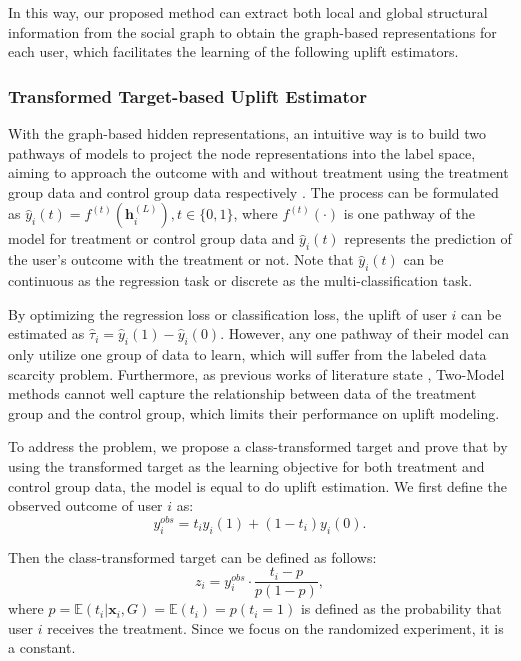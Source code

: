 In this way, our proposed method can extract both local and global structural information from the social graph to obtain the graph-based representations for each user, which facilitates the learning of the following uplift estimators.

\subsubsection{Transformed Target-based Uplift Estimator}
\label{sec:uplift}
With the graph-based hidden representations, an intuitive way is to build two pathways of models to project the node representations into the label space, aiming to approach the outcome with and without treatment using the treatment group data and control group data respectively \cite{guo2020learning,guo2020counterfactual}. The process can be formulated as $\hat{y}_i(t) = f^{(t)}(\mathbf{h}_i^{(L)}), t\in\{0,1\}$, where $f^{(t)}(\cdot)$ is one pathway of the model for treatment or control group data and $\hat{y}_{i}(t)$ represents the prediction of the user's outcome with the treatment or not. Note that $\hat{y}_{i}(t)$ can be continuous as the regression task or discrete as the multi-classification task. 

By optimizing the regression loss or classification loss, the uplift of user $i$ can be estimated as $\hat{\tau}_i = \hat{y}_{i}(1) - \hat{y}_{i}(0)$. However, any one pathway of their model can only utilize one group of data to learn, which will suffer from the labeled data scarcity problem. Furthermore, as previous works of literature state \cite{gutierrez2017causal}, Two-Model methods cannot well capture the relationship between data of the treatment group and the control group, which limits their performance on uplift modeling.  

To address the problem, we propose a class-transformed target and prove that by using the transformed target as the learning objective for both treatment and control group data, the model is equal to do uplift estimation. We first define the observed outcome of user $i$ as:
\begin{equation}
y_i^{obs} = t_iy_i(1) + (1 - t_i)y_i(0).
\label{eqn:y_obs}
\end{equation}

Then the class-transformed target can be defined as follows:
\begin{equation}  \label{eq_zi}
	z_i = y_i^{obs}\cdot \frac{t_i-p}{p(1-p)},
\end{equation}
where $p=\mathbb{E}(t_i|\mathbf{x}_i,\mathit{G})=\mathbb{E}(t_i)=p(t_i=1)$ is defined as the probability that user $i$ receives the treatment. Since we focus on the randomized experiment, it is a constant. 

